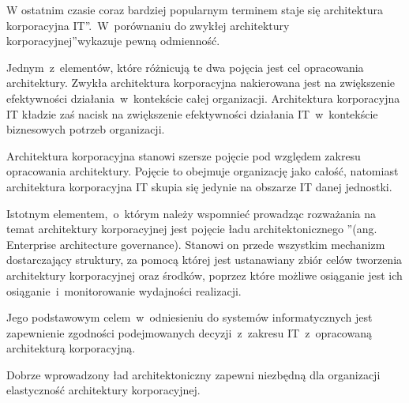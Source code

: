 W ostatnim czasie coraz bardziej popularnym terminem staje się \quotedblbase architektura korporacyjna IT\textquotedblright.~W~porównaniu do \quotedblbase zwykłej architektury korporacyjnej\textquotedblright wykazuje pewną odmienność.

Jednym~z~elementów, które różnicują te dwa pojęcia jest cel opracowania architektury. Zwykła architektura korporacyjna nakierowana jest na zwiększenie efektywności działania~w~kontekście całej organizacji. Architektura korporacyjna IT kładzie zaś nacisk na zwiększenie efektywności działania IT~w~kontekście biznesowych potrzeb organizacji. 

Architektura korporacyjna stanowi szersze pojęcie pod względem zakresu opracowania architektury. Pojęcie to obejmuje organizację jako całość, natomiast architektura korporacyjna IT skupia się jedynie na obszarze IT danej jednostki. 

Istotnym elementem,~o~którym należy wspomnieć prowadząc rozważania na temat architektury korporacyjnej jest pojęcie \quotedblbase ładu architektonicznego \textquotedblright (ang. Enterprise architecture governance). Stanowi on przede wszystkim mechanizm dostarczający struktury, za pomocą której jest ustanawiany zbiór celów tworzenia architektury korporacyjnej oraz środków, poprzez które możliwe osiąganie jest ich osiąganie~i~monitorowanie wydajności realizacji. 

Jego podstawowym celem~w~odniesieniu do systemów informatycznych jest zapewnienie zgodności podejmowanych decyzji~z~zakresu IT~z~opracowaną architekturą korporacyjną. 

Dobrze wprowadzony ład architektoniczny zapewni niezbędną dla organizacji elastyczność architektury korporacyjnej.

